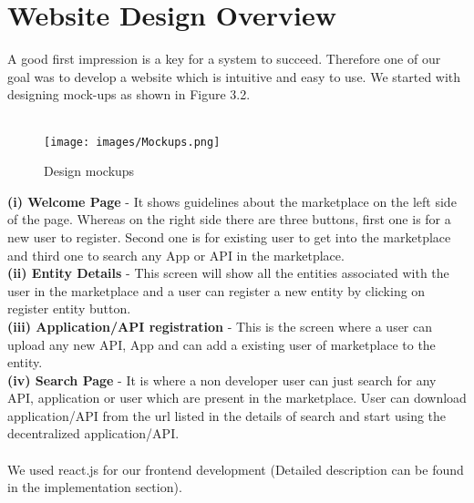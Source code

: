 \section{Website Design Overview}
A good first impression is a key for a system to succeed. Therefore one of our goal was to develop a website which is intuitive and easy to use. We started with designing mock-ups as shown in Figure 3.2. \\\\

\begin{figure}[h]
 \centering
\texttt{[image: images/Mockups.png]}
\caption{Design mockups}\label{fig:example2}
\end{figure}

\textbf{(i) Welcome Page} - It shows guidelines about the marketplace on the left side of the page. Whereas on the right side there are three buttons, first one is for a new user to register. Second one is for existing user to get into the marketplace and third one to search any App or API in the marketplace.\\
\textbf{(ii) Entity Details} - This screen will show all the entities associated with the user in the marketplace and a user can register a new entity by clicking on register entity button.\\
\textbf{(iii) Application/API registration} - This is the screen where a user can upload any new API, App and can add a existing user of marketplace to the entity.\\
\textbf{(iv) Search Page} - It is where a non developer user can just search for any API, application or user which are present in the marketplace. User can download application/API from the url listed in the details of search and start using the decentralized application/API.\\\\
We used react.js for our frontend development (Detailed description can be found in the implementation section).


